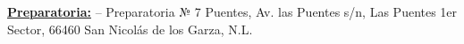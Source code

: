 \Entry
\href{https://preparatoria7.uanl.mx}
{\textbf{Preparatoria:}}
\hfill
{} --
\Gap
Preparatoria № 7 Puentes, Av. las Puentes s/n, Las Puentes 1er Sector, 66460 San Nicolás de los Garza, N.L.